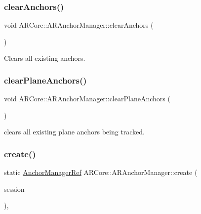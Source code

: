\subsubsection{\texorpdfstring{clear\+Anchors()}{clearAnchors()}}
{\footnotesize\ttfamily void A\+R\+Core\+::\+A\+R\+Anchor\+Manager\+::clear\+Anchors (\begin{DoxyParamCaption}{ }\end{DoxyParamCaption})}



Clears all existing anchors. 

\mbox{\label{class_a_r_core_1_1_a_r_anchor_manager_aec308e2f34682a568b2bda022a21a3ed}} 
\subsubsection{\texorpdfstring{clear\+Plane\+Anchors()}{clearPlaneAnchors()}}
{\footnotesize\ttfamily void A\+R\+Core\+::\+A\+R\+Anchor\+Manager\+::clear\+Plane\+Anchors (\begin{DoxyParamCaption}{ }\end{DoxyParamCaption})}



clears all existing plane anchors being tracked. 

\mbox{\label{class_a_r_core_1_1_a_r_anchor_manager_ab1293c2f5911e273573b1df3643fd086}} 
\subsubsection{\texorpdfstring{create()}{create()}}
{\footnotesize\ttfamily static \hyperlink{namespace_a_r_core_a3f2b9ba00b51ce19c1010f554a66a512}{Anchor\+Manager\+Ref} A\+R\+Core\+::\+A\+R\+Anchor\+Manager\+::create (\begin{DoxyParamCaption}\item[{A\+R\+Session $\ast$}]{session }\end{DoxyParamCaption})\hspace{0.3cm}{\ttfamily [inline]}, {\ttfamily [static]}}

